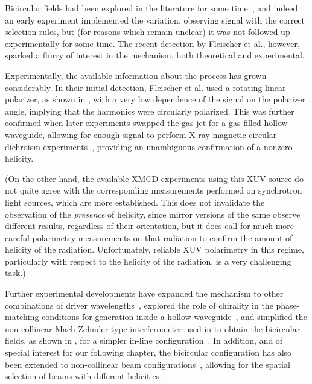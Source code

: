 Bicircular fields had been explored in the literature for some time~\cite{ EichmannExperiment, SFALong, SFAMilosevic, milosevic_bicircular-hhg_2000, SFAMilosevicBecker, milosevic_unusual-nonlinear-polarization_2000, milosevic_hhg-laser-phys_2001, averbukh_stability_2002, SFACeccherini, MilosevicIsolatedPulses}, and indeed an early experiment \cite{EichmannExperiment} implemented the variation, observing signal with the correct selection rules, but (for reasons which remain unclear) it was not followed up experimentally for some time. The recent detection by Fleischer et al., however, sparked a flurry of interest in the mechanism, both theoretical and experimental.


Experimentally, the available information about the process has grown considerably. In their initial detection, Fleischer et al. used a rotating linear polarizer, as shown in , with a very low dependence of the signal on the polarizer angle, implying that the harmonics were circularly polarized. This was further confirmed when later experiments swapped the gas jet for a gas-filled hollow waveguide, allowing for enough signal to perform X-ray magnetic circular dichroism experiments~\cite{kfir_generation_2015, fan_bright-circularly_2015}, providing an unambiguous confirmation of a nonzero helicity.

(On the other hand, the available XMCD experiments using this XUV source do not quite agree with the corresponding measurements performed on synchrotron light sources, which are more established. This does not invalidate the observation of the \textit{presence} of helicity, since mirror versions of the same observe different results, regardless of their orientation, but it does call for much more careful polarimetry measurements on that radiation to confirm the amount of helicity of the radiation. Unfortunately, reliable XUV polarimetry in this regime, particularly with respect to the helicity of the radiation, is a very challenging task.)


Further experimental developments have expanded the mechanism to other combinations of driver wavelengths~\cite{fan_bright-circularly_2015}, explored the role of chirality in the phase-matching conditions for generation inside a hollow waveguide~\cite{kfir_chiral-phase-matching_2016}, and simplified the non-collinear Mach-Zehnder-type interferometer used in  to obtain the bicircular fields, as shown in , for a simpler in-line configuration~\cite{kfir_in-line-bicircular_2016}. In addition, and of special interest for our following chapter, the bicircular configuration has also been extended to non-collinear beam configurations~\cite{hickstein_non-collinear_2015}, allowing for the spatial selection of beams with different helicities. 

